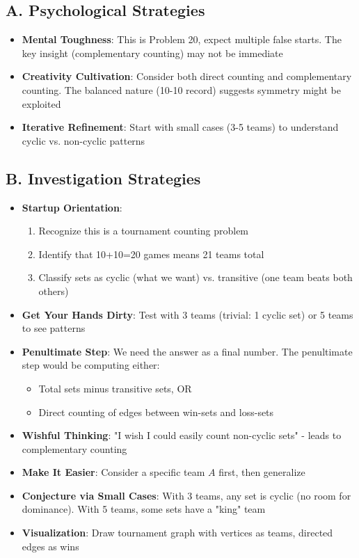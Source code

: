 \documentclass[]{article}
\begin{document}
\begin{strategicbox}
\subsection*{A. Psychological Strategies}
\begin{itemize}[leftmargin=*]
    \item \textbf{Mental Toughness}: This is Problem 20, expect multiple false starts. The key insight (complementary counting) may not be immediate
    \item \textbf{Creativity Cultivation}: Consider both direct counting and complementary counting. The balanced nature (10-10 record) suggests symmetry might be exploited
    \item \textbf{Iterative Refinement}: Start with small cases (3-5 teams) to understand cyclic vs. non-cyclic patterns
\end{itemize}

\subsection*{B. Investigation Strategies}
\begin{itemize}[leftmargin=*]
    \item \textbf{Startup Orientation}: 
    \begin{enumerate}
        \item Recognize this is a tournament counting problem
        \item Identify that 10+10=20 games means 21 teams total
        \item Classify sets as cyclic (what we want) vs. transitive (one team beats both others)
    \end{enumerate}
    \item \textbf{Get Your Hands Dirty}: Test with 3 teams (trivial: 1 cyclic set) or 5 teams to see patterns
    \item \textbf{Penultimate Step}: We need the answer as a final number. The penultimate step would be computing either:
    \begin{itemize}
        \item Total sets minus transitive sets, OR
        \item Direct counting of edges between win-sets and loss-sets
    \end{itemize}
    \item \textbf{Wishful Thinking}: "I wish I could easily count non-cyclic sets" - leads to complementary counting
    \item \textbf{Make It Easier}: Consider a specific team $A$ first, then generalize
    \item \textbf{Conjecture via Small Cases}: With 3 teams, any set is cyclic (no room for dominance). With 5 teams, some sets have a "king" team
    \item \textbf{Visualization}: Draw tournament graph with vertices as teams, directed edges as wins
\end{itemize}


\end{strategicbox}
\end{document}
